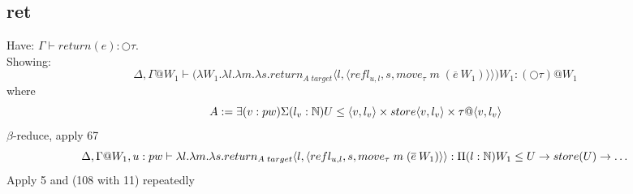 \documentclass{article}
\begin{document}
 \subsection{ret}
Have: $\Gamma \vdash return(e) : \bigcirc \tau$. \\
Showing: \[\Delta,\Gamma@W_1 \vdash \big(\lambda W_1. \lambda l. \lambda m . \lambda s. return_{A\;target} \langle l, \langle refl_{u, l}, s, move_{\tau}\;m\;(\overline{e} \: W_1) \rangle\rangle \big) W_1
: (\bigcirc \tau) @ W_1\]
where 
\[A := \exists(v: pw)\Sigma(l_v : \N)U \leq \langle v, l_v\rangle \times store\langle v, l_v\rangle \times \tau@\langle v, l_v\rangle\]
$\beta$-reduce, apply 67
\[\Delta,\Gamma@W_1, u: pw \vdash \lambda l. \lambda m . \lambda s. return_{A\;target} \langle l, \langle refl_{u, l}, s, move_{\tau}\;m\;(\overline{e} \: W_1) \rangle\rangle
: \Pi(l: \N)W_1 \leq U \imp store(U) \imp \dots \]
Apply 5 and (108 with 11) repeatedly
\end{document}
